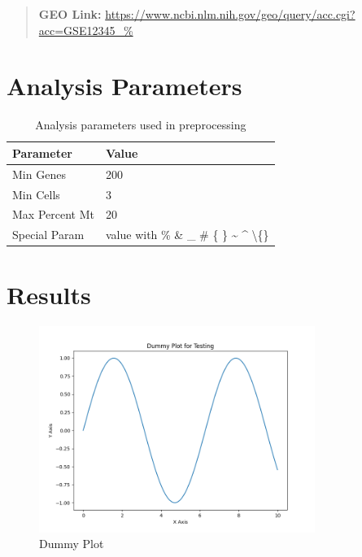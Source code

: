 \documentclass[12pt]{article}
\begin{document}
\begin{quote}
    \textbf{GEO Link:} \url{https://www.ncbi.nlm.nih.gov/geo/query/acc.cgi?acc=GSE12345\_\%}
\end{quote}

\section{Analysis Parameters}
\begin{table}[H]
    \centering
    \begin{tabular}{ll}
        \toprule
        \textbf{Parameter} & \textbf{Value} \\
        \midrule
        Min Genes & 200 \\
        Min Cells & 3 \\
        Max Percent Mt & 20 \\
        Special Param & value with \% \& \_ \# \{ \} \textasciitilde{} \textasciicircum{} \textbackslash\{\} \\

        \bottomrule
    \end{tabular}
    \caption{Analysis parameters used in preprocessing}
    \label{tab:parameters}
\end{table}

\section{{Results}}

    \begin{figure}[H]
        \centering
        \includegraphics[width=0.8\textwidth]{dummy_plot.png}
        \caption{Dummy Plot}
        \label{fig:dummy_plot}
    \end{figure}
    \newpage
\end{document}
